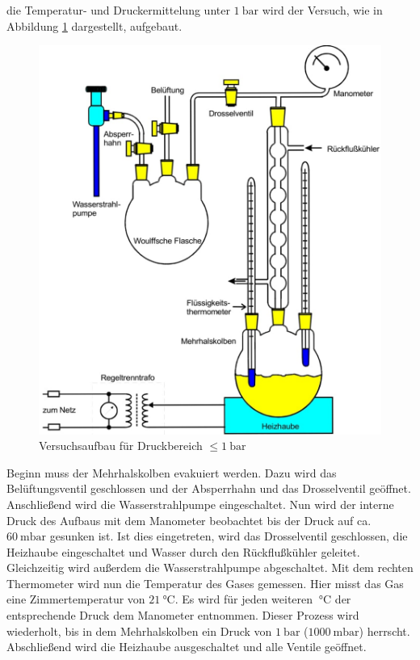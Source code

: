 \justifying die Temperatur- und Druckermittelung unter $\SI{1}{\bar}$ wird der Versuch, wie in Abbildung \ref{fig:2} dargestellt,
aufgebaut.

\begin{figure}
    \centering
    \includegraphics[width=0.75\linewidth]{./images/k1bar.jpg}
    \caption{Versuchsaufbau für Druckbereich $\leq \SI{1}{\bar}$ \cite{V203}}
    \label{fig:2}
\end{figure}
\newpage

\justifying Beginn muss der Mehrhalskolben evakuiert werden. Dazu wird das Belüftungsventil geschlossen und der Absperrhahn und
das Drosselventil geöffnet. Anschließend wird die Wasserstrahlpumpe eingeschaltet. Nun wird der interne Druck des Aufbaus mit dem Manometer
beobachtet bis der Druck auf ca. $\SI{60}{\milli\bar}$ gesunken ist. Ist dies eingetreten, wird das Drosselventil geschlossen, die Heizhaube
eingeschaltet und Wasser durch den Rückflußkühler geleitet. Gleichzeitig wird außerdem die Wasserstrahlpumpe abgeschaltet. Mit dem rechten
Thermometer wird nun die Temperatur des Gases gemessen. Hier misst das Gas eine Zimmertemperatur von $\SI{21}{\celsius}$. Es wird für jeden 
weiteren $\SI{}{\celsius}$ der entsprechende Druck dem Manometer entnommen. Dieser Prozess wird wiederholt, bis in dem Mehrhalskolben ein Druck 
von $\SI{1}{\bar}$ ($\SI{1000}{\milli\bar}$) herrscht. Abschließend wird die Heizhaube ausgeschaltet und alle Ventile geöffnet.  


